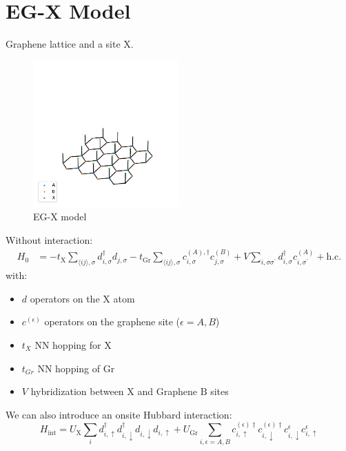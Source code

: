 \documentclass[../notes.tex]{subfiles}
\begin{document}
\section{EG-X Model}\label{sec:eg-x-model}

Graphene lattice and a site X\@.
\begin{figure}[htb]
	\centering
	\includegraphics[width=0.5\textwidth]{images/eg-x lattice}
	\caption{EG-X model}
	\label{fig:eg-x model}
\end{figure}

Without interaction:
\begin{align}
	H_0 &= -t_{\mathrm{X}} \sum_{\langle ij \rangle, \sigma} d_{i, \sigma}^{\dagger} d_{j, \sigma}
	-t_{\mathrm{Gr}} \sum_{\langle ij \rangle, \sigma}
	c_{i, \sigma}^{(A), \dagger} c_{j, \sigma}^{(B)}
	+ V \sum_{i, \sigma \sigma^{\prime}}
	d_{i, \sigma}^{\dagger} c_{i, \sigma^{\prime}}^{(A)} + \mathrm{h.c.}
	\label{eq:EG-X model Hamiltonian non-interacting}
\end{align}
with:
\begin{itemize}
	\item \(d\) operators on the X atom
	\item \(c^{(\epsilon)}\) operators on the graphene site (\(\epsilon = A, B\))
	\item \(t_X\) NN hopping for X
	\item \(t_{Gr}\) NN hopping of Gr
	\item \(V\) hybridization between \(\mathrm{X}\) and Graphene \(\mathrm{B}\) sites
\end{itemize}
We can also introduce an onsite Hubbard interaction:
\begin{equation}
	H_{\mathrm{int}} = U_{\mathrm{X}} \sum_{i} d_{i, \uparrow}^{\dagger} d_{i, \downarrow}^{\dagger} d_{i, \downarrow} d_{i, \uparrow}
	+ U_{\mathrm{Gr}} \sum_{i, \epsilon=A, B} c_{i, \uparrow}^{(\epsilon) \dagger} c_{i, \downarrow}^{(\epsilon) \dagger} c_{i, \downarrow}^{\epsilon} c_{i, \uparrow}^{\epsilon}
\end{equation}
\end{document}
